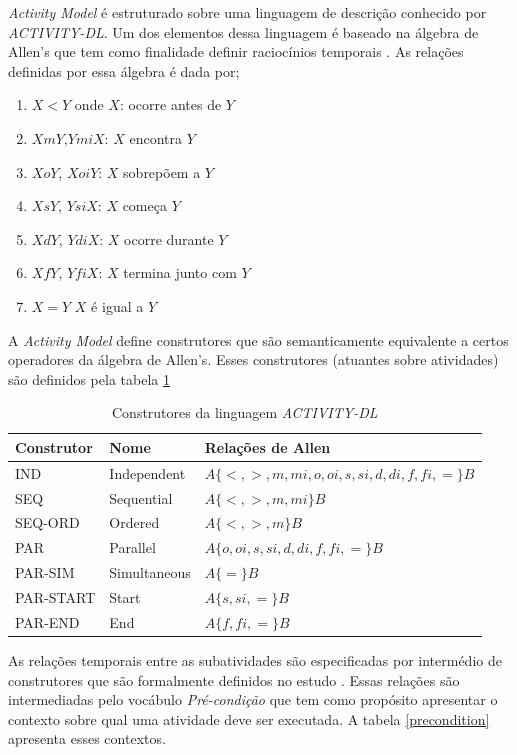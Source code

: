 \textit{Activity Model} é estruturado sobre uma linguagem de descrição conhecido por \textit{ACTIVITY-DL}. Um dos elementos dessa linguagem é baseado na álgebra de Allen's que tem como finalidade definir raciocínios temporais \cite{allenalgebric}. As relações definidas por essa álgebra é dada por; 

\begin{enumerate}
	\item $X < Y$ onde $X$: ocorre antes de $Y$ 
	\item $X m Y$,$Y mi X$: $X$ encontra $Y$
	\item $X o Y$, $X oi Y$: $X$ sobrepõem a $Y$
	\item $X s Y$, $Y si X$: $X$ começa $Y$
	\item $X d Y$, $Y di X$: $X$ ocorre durante $Y$	  
	\item $X f Y$, $Y fi X$: $X$ termina junto com $Y$	  	
	\item $X = Y$ $X$ é igual a $Y$	  		
\end{enumerate}

A \textit{Activity Model} define construtores que são semanticamente equivalente a certos operadores da álgebra de Allen's. Esses construtores (atuantes sobre atividades) são definidos pela tabela \ref{acticonstruct}

\begin{table}[H]
\centering
\begin{tabular}{|l|l|l|}
\hline
Construtor & Nome         & Relações de Allen \\ \hline
IND        & Independent  & $A \{ <,>,m,mi,o,oi,s,si,d,di,f,fi,= \} B$\\ \hline
SEQ        & Sequential   & $A \{ <,>,m,mi \} B$\\ \hline
SEQ-ORD    & Ordered      & $A \{ <,>,m \} B$\\ \hline
PAR        & Parallel     & $A \{ o,oi,s,si,d,di,f,fi,= \} B$ \\ \hline
PAR-SIM    & Simultaneous & $A \{ = \} B$\\ \hline
PAR-START  & Start        & $A \{ s,si,= \} B$\\ \hline
PAR-END    & End          & $A \{ f,fi,= \} B$ \\ \hline
\end{tabular}
\caption{Construtores da linguagem \textit{ACTIVITY-DL} \cite{v3sframework}}
\label{acticonstruct}
\end{table}

As relações temporais entre as subatividades são especificadas por intermédio de construtores que são formalmente definidos no estudo \cite{allenalgebric}. Essas relações são intermediadas pelo vocábulo \textit{Pré-condição} que tem como propósito apresentar o contexto sobre qual uma atividade deve ser executada. A tabela \ref{precondition} apresenta esses contextos.


